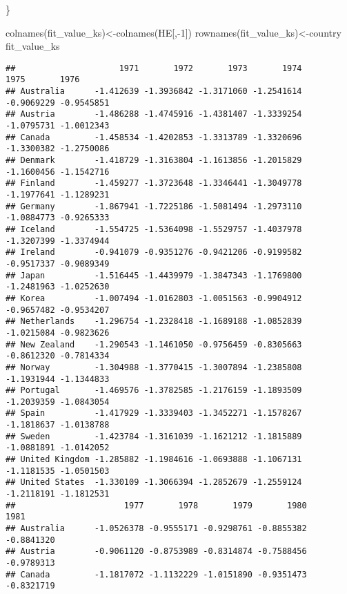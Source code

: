 \documentclass[
]{article}
\newenvironment{Shaded}{\begin{snugshade}}{\end{snugshade}}
\newcommand{\DecValTok}[1]{\textcolor[rgb]{0.00,0.00,0.81}{#1}}
\newcommand{\FunctionTok}[1]{\textcolor[rgb]{0.00,0.00,0.00}{#1}}
\newcommand{\NormalTok}[1]{#1}
\newcommand{\OtherTok}[1]{\textcolor[rgb]{0.56,0.35,0.01}{#1}}
\newcommand{\SpecialCharTok}[1]{\textcolor[rgb]{0.00,0.00,0.00}{#1}}
\begin{document}
\begin{Shaded}
\begin{Highlighting}[]
\NormalTok{\}}
\end{Highlighting}
\end{Shaded}

\begin{Shaded}
\begin{Highlighting}[]
\FunctionTok{colnames}\NormalTok{(fit\_value\_ks)}\OtherTok{\textless{}{-}}\FunctionTok{colnames}\NormalTok{(HE[,}\SpecialCharTok{{-}}\DecValTok{1}\NormalTok{])}
\FunctionTok{rownames}\NormalTok{(fit\_value\_ks)}\OtherTok{\textless{}{-}}\NormalTok{country}
\NormalTok{fit\_value\_ks}
\end{Highlighting}
\end{Shaded}

\begin{verbatim}
##                     1971       1972       1973       1974       1975       1976
## Australia      -1.412639 -1.3936842 -1.3171060 -1.2541614 -0.9069229 -0.9545851
## Austria        -1.486288 -1.4745916 -1.4381407 -1.3339254 -1.0795731 -1.0012343
## Canada         -1.458534 -1.4202853 -1.3313789 -1.3320696 -1.3300382 -1.2750086
## Denmark        -1.418729 -1.3163804 -1.1613856 -1.2015829 -1.1600456 -1.1542716
## Finland        -1.459277 -1.3723648 -1.3346441 -1.3049778 -1.1977641 -1.1289231
## Germany        -1.867941 -1.7225186 -1.5081494 -1.2973110 -1.0884773 -0.9265333
## Iceland        -1.554725 -1.5364098 -1.5529757 -1.4037978 -1.3207399 -1.3374944
## Ireland        -0.941079 -0.9351276 -0.9421206 -0.9199582 -0.9517337 -0.9089349
## Japan          -1.516445 -1.4439979 -1.3847343 -1.1769800 -1.2481963 -1.0252630
## Korea          -1.007494 -1.0162803 -1.0051563 -0.9904912 -0.9657482 -0.9534207
## Netherlands    -1.296754 -1.2328418 -1.1689188 -1.0852839 -1.0215084 -0.9823626
## New Zealand    -1.290543 -1.1461050 -0.9756459 -0.8305663 -0.8612320 -0.7814334
## Norway         -1.304988 -1.3770415 -1.3007894 -1.2385808 -1.1931944 -1.1344833
## Portugal       -1.469576 -1.3782585 -1.2176159 -1.1893509 -1.2039359 -1.0843054
## Spain          -1.417929 -1.3339403 -1.3452271 -1.1578267 -1.1818637 -1.0138788
## Sweden         -1.423784 -1.3161039 -1.1621212 -1.1815889 -1.0881891 -1.0142052
## United Kingdom -1.285882 -1.1984616 -1.0693888 -1.1067131 -1.1181535 -1.0501503
## United States  -1.330109 -1.3066394 -1.2852679 -1.2559124 -1.2118191 -1.1812531
##                      1977       1978       1979       1980       1981
## Australia      -1.0526378 -0.9555171 -0.9298761 -0.8855382 -0.8841320
## Austria        -0.9061120 -0.8753989 -0.8314874 -0.7588456 -0.9789313
## Canada         -1.1817072 -1.1132229 -1.0151890 -0.9351473 -0.8321719

\end{verbatim}
\end{document}
